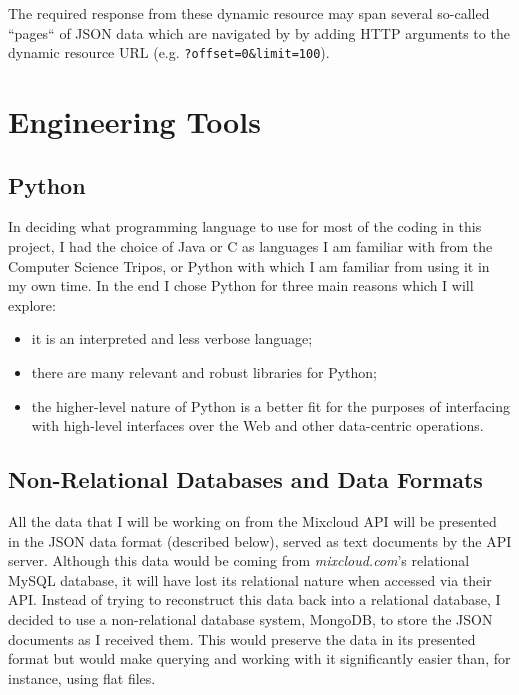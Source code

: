 \documentclass[a4paper,12pt,twoside,notitlepage]{report}
\def\mixurl{\emph{mixcloud.com}}
\newcommand{\todo}[1]{\ifdraft{\textsf{\color{red} TODO: #1}}\fi}
\begin{document}
The required response from these dynamic resource may span several
so-called ``pages`` of JSON data which are navigated by by adding HTTP
arguments to the dynamic resource URL (e.g. \texttt{?offset=0\&limit=100}).


\section{Engineering Tools}

\subsection{Python}

In deciding what programming language to use for most of the coding in this
project, I had the choice of Java or C as languages I am familiar with from the
Computer Science Tripos, or Python with which I am familiar from using it in my
own time. In the end I chose Python for three main reasons which I will explore:
\begin{itemize}
 \item it is an interpreted and less verbose language; 
 \item there are many relevant and robust libraries for Python; 
 \item the higher-level nature of Python is a better fit for the purposes
of interfacing with high-level interfaces over the Web and other data-centric
operations.
\end{itemize}

\todo{expand on above}

\subsection{Non-Relational Databases and Data Formats}
\label{subsec:nonrel}

All the data that I will be working on from the Mixcloud API will be presented
in the JSON data format (described below), served as text documents by the API
server. Although this data would be coming from \mixurl's relational MySQL
database, it will have lost its relational nature when accessed via their API.
Instead of trying to reconstruct this data back into a relational database, I
decided to use a non-relational database system, MongoDB, to store the JSON
documents as I received them. This would preserve the data in its presented
format but would make querying and working with it significantly easier than,
for instance, using flat files.
\end{document}
